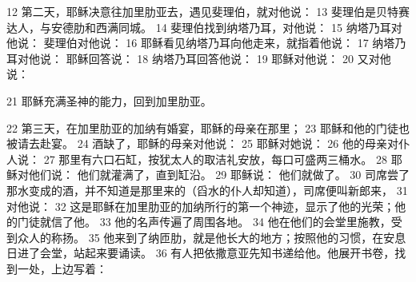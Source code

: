 12  第二天，耶稣决意往加里肋亚去，遇见斐理伯，就对他说： 13   斐理伯是贝特赛达人，与安德肋和西满同城。 14  斐理伯找到纳塔乃耳，对他说： 15  纳塔乃耳对他说： 斐理伯对他说： 16  耶稣看见纳塔乃耳向他走来，就指着他说： 17  纳塔乃耳对他说： 耶稣回答说： 18  纳塔乃耳回答他说： 19  耶稣对他说： 20  又对他说：\par

21  耶稣充满圣神的能力，回到加里肋亚。\par

22  第三天，在加里肋亚的加纳有婚宴，耶稣的母亲在那里； 23  耶稣和他的门徒也被请去赴宴。 24  酒缺了，耶稣的母亲对他说： 25  耶稣对她说： 26  他的母亲对仆人说： 27  那里有六口石缸，按犹太人的取洁礼安放，每口可盛两三桶水。 28   耶稣对他们说： 他们就灌满了，直到缸沿。 29  耶稣说： 他们就做了。 30  司席尝了那水变成的酒，并不知道是那里来的（舀水的仆人却知道），司席便叫新郎来， 31  对他说： 32  这是耶稣在加里肋亚的加纳所行的第一个神迹，显示了他的光荣；他的门徒就信了他。 33  他的名声传遍了周围各地。 34  他在他们的会堂里施教，受到众人的称扬。 35  他来到了纳匝肋，就是他长大的地方；按照他的习惯，在安息日进了会堂，站起来要诵读。 36  有人把依撒意亚先知书递给他。他展开书卷，找到一处，上边写着：\par

